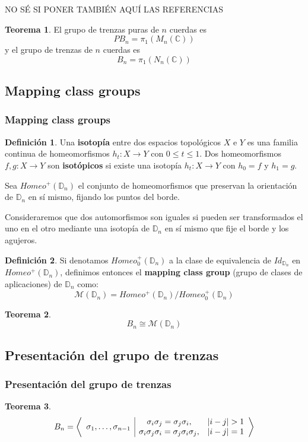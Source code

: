 \documentclass{beamer}
\theoremstyle{definition}
\newtheorem{teorema}{Teorema}
\newtheorem{defi}{Definición}
\newcommand{\C}{\mathbb{C}}
\newcommand{\D}{\mathbb{D}}
\begin{document}
\begin{frame}
NO SÉ SI PONER TAMBIÉN AQUÍ LAS REFERENCIAS 
\begin{teorema}
El grupo de trenzas puras de $n$ cuerdas es
$$PB_n=\pi_1(M_n(\C))$$
y el grupo de trenzas de $n$ cuerdas es
$$B_n=\pi_1(N_n(\C))$$
\end{teorema}
\end{frame}

\subsection{Mapping class groups}

\begin{frame}
\frametitle{Mapping class groups}
\begin{defi}
Una \textbf{isotopía} entre dos espacios topológicos $X$ e $Y$ es una familia continua de homeomorfismos $h_t:X\to Y$ con $0\leq t\leq 1$. Dos homeomorfismos $f,g:X\to Y$ son \textbf{isotópicos} si existe una isotopía $h_t:X\to Y$ con $h_0=f$ y $h_1=g$. 
\end{defi}
Sea $Homeo^+(\D_n)$ el conjunto de homeomorfismos que preservan la orientación de $\D_n$ en sí mismo, fijando los puntos del borde. 
\end{frame}


\begin{frame}
Consideraremos que dos automorfismos son iguales si pueden ser transformados el uno en el otro mediante una isotopía de $\D_n$ en sí mismo que fije el borde y los agujeros.
\begin{defi} Si denotamos $Homeo^+_0(\D_n)$ a la clase de equivalencia de $Id_{\D_n}$ en $Homeo^+(\D_n)$, definimos entonces el \textbf{mapping class group} (grupo de clases de aplicaciones) de $\D_n$ como:
$$\mathcal{M}(\D_n)=Homeo^+(\D_n)/Homeo^+_0(\D_n)$$
\end{defi}
\begin{teorema}
$$B_n\cong \mathcal{M}(\D_n)$$
\end{teorema}
\end{frame}

\subsection{Presentación del grupo de trenzas}



\begin{frame}
\frametitle{Presentación del grupo de trenzas}
\begin{teorema}
\[
B_n=\left\langle\begin{array}{c| c c}
\multirow{2}{*}{$\sigma_1,\dots,\sigma_{n-1}$} & \sigma_i\sigma_j=\sigma_j\sigma_i, & |i-j|>1\\
& \sigma_i\sigma_j\sigma_i=\sigma_j\sigma_i\sigma_j, & |i-j|=1
\end{array}\right\rangle
\]
\end{teorema}
\end{frame}
\end{document}
